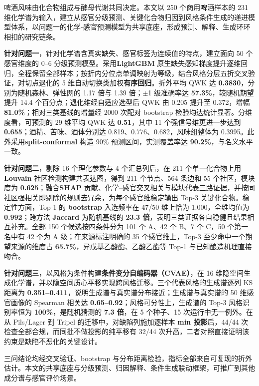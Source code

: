 \documentclass[zihao=-4,a4paper,UTF8,fontset=none]{ctexart}
\begin{document}
\begin{cumcmabstract}
啤酒风味由化合物组成与酵母代谢共同决定。本文以 250 个商用啤酒样本的 231 维化学谱为输入，建立从感官分级预测、关键化合物归因到风格条件生成的递进模型体系，以问题一的化学-感官预测模型为共享底座，形成预测、解释、生成环环相扣的研究链条。

\textbf{针对问题一}，针对化学谱含真实缺失、感官标签为连续值的特点，建立面向 50 个感官维度的 0--6 分级预测模型。采用\textbf{LightGBM} 原生缺失感知梯度提升逐维回归，全程保留全部样本；按折内分位点单调映射为等级，结合风格分层五折交叉验证，对切点退化的 5 维自动切换类加权\textbf{有序回归}。折外平均 QWK 达 \textbf{0.3830}，分别为随机森林、弹性网的 1.17 倍与 1.39 倍；$\pm$1 级准确率达 \textbf{57.3\%}，较随机期望提升 14.4 个百分点；退化维经自适应选型后 QWK 由 0.205 提升至 0.372，增幅 \textbf{81.0\%}；相对三类基线的增量经 2000 次配对 bootstrap 检验均达统计显著。分维度看，可预测的 29 维平均 QWK 达 \textbf{0.51}，其中 11 个强信号维更进一步达到 \textbf{0.655}；酒精、苦味、酒体分别达 0.819、0.776、0.682，风味组整体为 0.3995。此外采用\textbf{split-conformal} 构造 90\% 预测区间，实测覆盖率达 \textbf{90.2\%}，与名义水平一致。

\textbf{针对问题二}，剔除 16 个理化参数与 4 个汇总列后，在 211 个单一化合物上用\textbf{Louvain} 社区检测构建共表达图，得到 211 个节点、564 条边和 55 个社区，模块度为 \textbf{0.625}；融合\textbf{SHAP} 贡献、化学--感官交叉相关与模块代表三路证据，并按同社区强相关即剔除的规则去冗余，为每个感官维稳定输出 Top-3 关键化合物。稳定性方面，Top-1 的 \textbf{bootstrap} 入选频率在 47/50 维上恰为 1.000，全维均值为 \textbf{0.992}；跨方法 \textbf{Jaccard} 为随机基线的 \textbf{23.3 倍}，表明三类证据各自稳健且结果相互补充。全部 150 个候选按四条件分为 101 个 A、42 个 B、7 个 C，50 个第一名中有 42 个为 A 级；在来源标注明确的 35 个感官维上，Top-3 至少命中一个期望来源的维度占 \textbf{65.7\%}，异戊基乙酸酯、乙酸乙酯等 Top-1 与已知酿造机理直接吻合。

\textbf{针对问题三}，以风格为条件构建\textbf{条件变分自编码器（CVAE）}，在 16 维隐空间生成化学谱，并以隐空间质心平移实现跨风格迁移。三个代表风格的生成谱逐列 KS 距离为 \textbf{0.351--0.411}，说明生成谱与真实谱分布接近；生成谱与真实谱的 50 维感官画像的 Spearman 相关达 \textbf{0.65--0.92}；风格可分性上，生成谱的 Top-3 风格识别率恒为 \textbf{100\%}，是随机猜测的 \textbf{7.3 倍}，在 5 个种子、15 次运行中无一例外。在从 Pils/Lager 到 Tripel 的迁移中，对缺陷列施加逐样本 \textbf{min 投影}后，44/44 次检查全部合规，而同批不做投影的纯平移有 32/44 次升高，二者对照直接证明该约束是缺陷不恶化的关键设计。

三问结论均经交叉验证、bootstrap 与分布距离检验，指标全部来自可复现的折外估计。本文的共享底座与分级预测、归因解释、条件生成联动框架，可推广到其他成分谱与感官评价场景。
\end{cumcmabstract}
\end{document}
